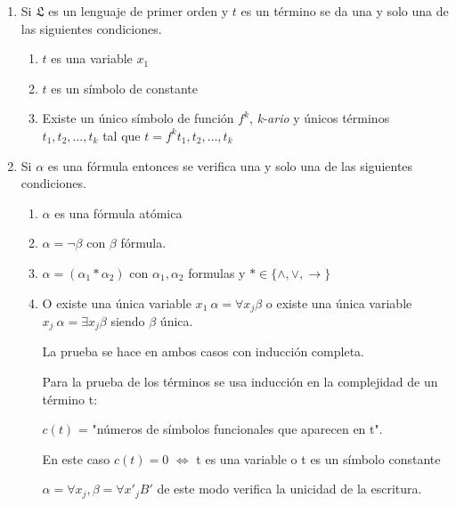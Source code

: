\begin{theorem}
$\;$
\begin{enumerate}
	\item Si $\mathfrak{L}$ es un lenguaje de primer orden y $t$ es un t\'ermino se da una y solo una de las siguientes condiciones.
	\begin{enumerate}
		\item $t$ es una variable $x_1$
		\item $t$ es un s\'imbolo de constante
		\item Existe un \'unico s\'imbolo de funci\'on $f^k$, \textit{k-ario} y \'unicos t\'erminos $t_1, t_2, \ldots, t_k$ tal que $t = f^k t_1, t_2, \ldots, t_k$		
	\end{enumerate}
	\item Si $\alpha$ es una f\'ormula entonces se verifica una y solo una de las siguientes condiciones.
	\begin{enumerate}
		\item $\alpha$ es una f\'ormula at\'omica
		\item $\alpha = \neg \beta$ con $\beta$ f\'ormula.
		\item $\alpha = (\alpha_1 * \alpha_2)$ con $\alpha_1, \alpha_2$ formulas y $* \in \{ 				\land, \lor, \rightarrow \}$
		\item O existe una \'unica variable $x_1 \ \alpha = \forall x_j \beta$ o existe una \'unica 			variable $x_j \ \alpha = \exists x_j \beta$ siendo $\beta$ \'unica.
		
		La prueba se hace en ambos casos con inducci\'on completa.

		Para la prueba de los t\'erminos se usa inducci\'on en la complejidad de un t\'ermino t:

		$c(t)$ = "n\'umeros de s\'imbolos funcionales que aparecen en t".

		En este caso $c(t) = 0$ $\iff$ t es una variable o t es un s\'imbolo constante
		
		$\alpha = \forall x_j, \beta = \forall x'_j B'$ de este modo verifica la unicidad de la escritura.
		
		
	\end{enumerate}
\end{enumerate}

\end{theorem}